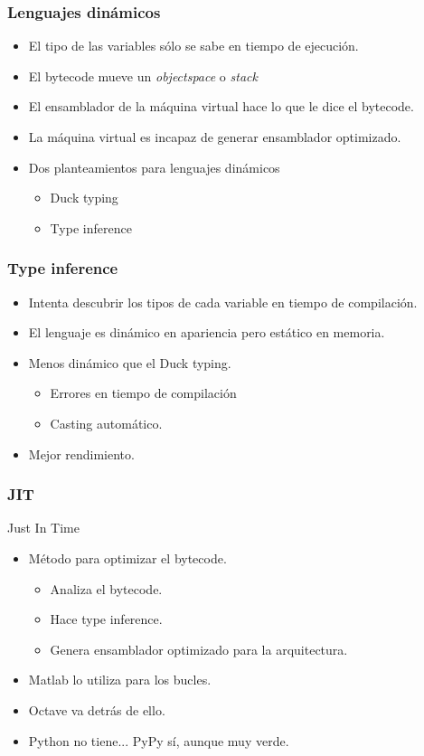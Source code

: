 \documentclass{beamer}
\begin{document}
\begin{frame}
  \frametitle{Lenguajes dinámicos}
  \begin{itemize}
  \item El tipo de las variables sólo se sabe en tiempo de ejecución.
  \item El bytecode mueve un \textit{objectspace} o \textit{stack}
  \item El ensamblador de la máquina virtual hace lo que le dice el
    bytecode.
  \item La máquina virtual es incapaz de generar ensamblador
    optimizado.
  \item Dos planteamientos para lenguajes dinámicos
    \begin{itemize}
    \item Duck typing
    \item Type inference
    \end{itemize}
  \end{itemize}
\end{frame}

\begin{frame}
  \frametitle{Type inference}
  \begin{itemize}
  \item Intenta descubrir los tipos de cada variable en tiempo de
    compilación.
  \item El lenguaje es dinámico en apariencia pero estático en
    memoria.
  \item Menos dinámico que el Duck typing.
    \begin{itemize}
    \item Errores en tiempo de compilación
    \item Casting automático.
    \end{itemize}
  \item Mejor rendimiento.
  \end{itemize}
\end{frame}

\begin{frame}
  \frametitle{JIT}
  Just In Time
  \begin{itemize}
  \item Método para optimizar el bytecode.
    \begin{itemize}
    \item Analiza el bytecode.
    \item Hace type inference.
    \item Genera ensamblador optimizado para la arquitectura.
    \end{itemize}
  \item Matlab lo utiliza para los bucles.
  \item Octave va detrás de ello.
  \item Python no tiene... PyPy sí, aunque muy verde.
  \end{itemize}
\end{frame}
\end{document}
